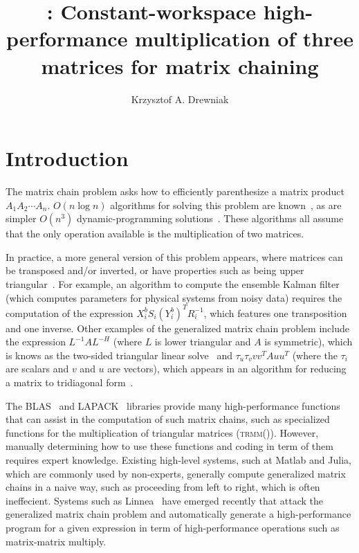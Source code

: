 \documentclass[12pt]{article}
\title{\gemmt{}: Constant-workspace high-performance multiplication of three matrices for matrix chaining}
\author{Krzysztof A. Drewniak}
\newcommand*{\mycite}[1]{~\cite{#1}}
\begin{document}
\maketitle{}
\section{Introduction}
The matrix chain problem asks how to efficiently parenthesize a matrix product $A_1A_2\cdots A_n$.
$O(n \log n)$ algorithms for solving this problem are known\mycite{Hu1984}, as are simpler $O(n^3)$ dynamic-programming solutions\mycite{Barthels2018}.
These algorithms all assume that the only operation available is the multiplication of two matrices.

In practice, a more general version of this problem appears, where matrices can be transposed and/or inverted, or have properties such as being upper triangular\mycite{Barthels2018}.
For example, an algorithm to compute the ensemble Kalman filter\mycite{Rao2017} (which computes parameters for physical systems from noisy data) requires the computation of the expression $X_i^b S_i (Y_i^b)^T R_i^{-1}$, which features one transposition and one inverse.
Other examples of the generalized matrix chain problem include the expression $L^{-1}AL^{-H}$ (where $L$ is lower triangular and $A$ is symmetric), which is knows as the two-sided triangular linear solve\mycite{Parikh2017} and $\tau_u\tau_v vv^TAuu^T$ (where the $\tau_i$ are scalars and $v$ and $u$ are vectors), which appears in an algorithm for reducing a matrix to tridiagonal form\mycite{Choi1995}.

The BLAS\mycite{blas_standard} and LAPACK\mycite{lapack_ug} libraries provide many high-performance functions that can assist in the computation of such matrix chains, such as specialized functions for the multiplication of triangular matrices (\textsc{trmm}()).
However, manually determining how to use these functions and coding in term of them requires expert knowledge.
Existing high-level systems, such at Matlab and Julia, which are commonly used by non-experts, generally compute generalized matrix chains in a naive way, such as proceeding from left to right, which is often ineffecient.
Systems such as Linnea\mycite{Barthels2017} have emerged recently that attack the generalized matrix chain problem and automatically generate a high-performance program for a given expression in term of high-performance operations such as matrix-matrix multiply.
\end{document}
